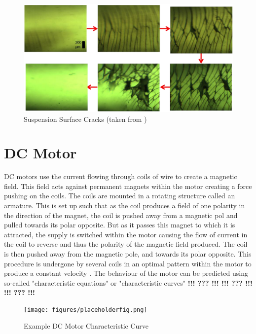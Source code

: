 \documentclass[twoside,a4]{report}
\def\br{\newline \newline \noindent}
\def\cbh{\large\bfseries !!! ??? !!! \normalsize\normalfont}
\begin{document}
	\begin{figure}[!htb]
		\centering
		\includegraphics[scale=0.45]{images/cfors_cracks.png}
		\caption{Suspension Surface Cracks (taken from \cite{thescforsyth})}
		\label{cforscracks}
	\end{figure}

	\section*{DC Motor}
	DC motors use the current flowing through coils of wire to create a magnetic field. This field acts against permanent magnets within the motor creating a force pushing on the coils. The coils are mounted in a rotating structure called an armature. This is set up such that as the coil produces a field of one polarity in the direction of the magnet, the coil is pushed away from a magnetic pol and pulled towards its polar opposite. But as it passes this magnet to which it is attracted, the supply is switched within the motor causing the flow of current in the coil to reverse and thus the polarity of the magnetic field produced. The coil is then pushed away from the magnetic pole, and towards its polar opposite. This procedure is undergone by several coils in an optimal pattern within the motor to produce a constant velocity \cite{backdcmotor}.
	\br
	The behaviour of the motor can be predicted using so-called "characteristic equations" or "characteristic curves" \br \cbh \cbh \cbh
	
	\begin{figure}[!htb]
		\centering
		\texttt{[image: figures/placeholderfig.png]}
		\caption{Example DC Motor Characteristic Curve}
		\label{figmotcharexample}
	\end{figure}
	
\end{document}
